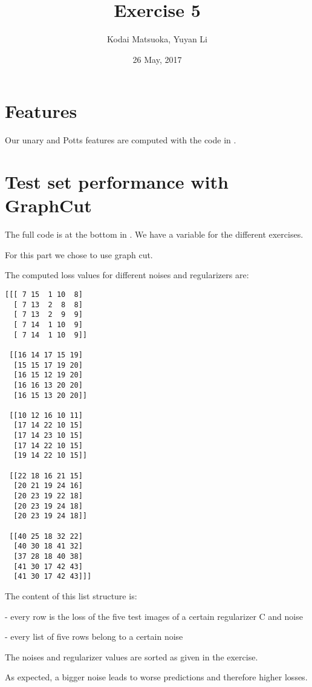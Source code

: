 \documentclass[12pt]{scrartcl}
\author{Kodai Matsuoka, Yuyan Li}
\title{Exercise 5}
\date{26 May, 2017}
\begin{document}
\maketitle

\section{Features}

Our unary and Potts features are computed with the code in .



\section{Test set performance with GraphCut}
The full code is at the bottom in . We have a variable  for the different exercises.

For this part we chose  to use graph cut.

The computed loss values for different noises and regularizers are:

\begin{verbatim}
[[[ 7 15  1 10  8]
  [ 7 13  2  8  8]
  [ 7 13  2  9  9]
  [ 7 14  1 10  9]
  [ 7 14  1 10  9]]

 [[16 14 17 15 19]
  [15 15 17 19 20]
  [16 15 12 19 20]
  [16 16 13 20 20]
  [16 15 13 20 20]]

 [[10 12 16 10 11]
  [17 14 22 10 15]
  [17 14 23 10 15]
  [17 14 22 10 15]
  [19 14 22 10 15]]

 [[22 18 16 21 15]
  [20 21 19 24 16]
  [20 23 19 22 18]
  [20 23 19 24 18]
  [20 23 19 24 18]]

 [[40 25 18 32 22]
  [40 30 18 41 32]
  [37 28 18 40 38]
  [41 30 17 42 43]
  [41 30 17 42 43]]]
\end{verbatim}

The content of this list structure is:

- every row is the loss of the five test images of a certain regularizer C and noise

- every list of five rows belong to a certain noise

The noises and regularizer values are sorted as given in the exercise.

As expected, a bigger noise leads to worse predictions and therefore higher losses.
\end{document}

